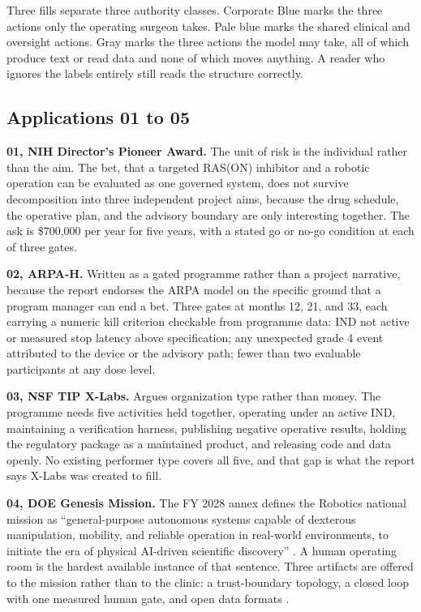 Three fills separate three authority classes. Corporate Blue marks the three
actions only the operating surgeon takes. Pale blue marks the shared clinical
and oversight actions. Gray marks the three actions the model may take, all of
which produce text or read data and none of which moves anything. A reader who
ignores the labels entirely still reads the structure correctly.

\subsection{Applications 01 to 05}

\textbf{01, NIH Director's Pioneer Award.} The unit of risk is the individual
rather than the aim. The bet, that a targeted RAS(ON) inhibitor and a robotic
operation can be evaluated as one governed system, does not survive
decomposition into three independent project aims, because the drug schedule,
the operative plan, and the advisory boundary are only interesting together. The
ask is \$700,000 per year for five years, with a stated go or no-go condition at
each of three gates.

\textbf{02, ARPA-H.} Written as a gated programme rather than a project
narrative, because the report endorses the ARPA model on the specific ground
that a program manager can end a bet. Three gates at months 12, 21, and 33, each
carrying a numeric kill criterion checkable from programme data: IND not active
or measured stop latency above specification; any unexpected grade 4 event
attributed to the device or the advisory path; fewer than two evaluable
participants at any dose level.

\textbf{03, NSF TIP X-Labs.} Argues organization type rather than money. The
programme needs five activities held together, operating under an active IND,
maintaining a verification harness, publishing negative operative results,
holding the regulatory package as a maintained product, and releasing code and
data openly. No existing performer type covers all five, and that gap is what
the report says X-Labs was created to fill.

\textbf{04, DOE Genesis Mission.} The FY 2028 annex defines the Robotics
national mission as ``general-purpose autonomous systems capable of dexterous
manipulation, mobility, and reliable operation in real-world environments, to
initiate the era of physical AI-driven scientific discovery''
\cite{kratsiosvought2026fy2028priorities}. A human operating room is the hardest
available instance of that sentence. Three artifacts are offered to the mission
rather than to the clinic: a trust-boundary topology, a closed loop with one
measured human gate, and open data formats \cite{eo14363genesismission}.

